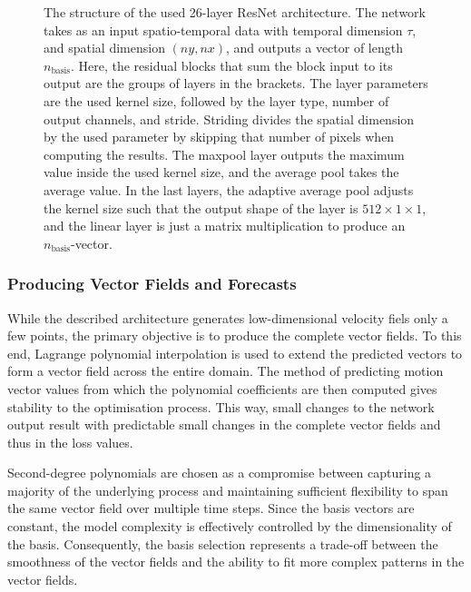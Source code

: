 \begin{figure}[H]
    \centering
    \begin{footnotesize}
        
    \end{footnotesize}
    \caption{\label{fig:resnetmodel}The structure of the used 26-layer ResNet architecture.
    The network takes as an input spatio-temporal data with temporal dimension $\tau$, and spatial dimension $(ny,nx)$, and outputs a vector of length $n_{\text{basis}}$.
    Here, the residual blocks that sum the block input to its output are the groups of layers in the brackets.
    The layer parameters are the used kernel size, followed by the layer type, number of output channels, and stride.
    Striding divides the spatial dimension by the used parameter by skipping that number of pixels when computing the results.
    The maxpool layer outputs the maximum value inside the used kernel size, and the average pool takes the average value.
    In the last layers, the adaptive average pool adjusts the kernel size such that the output shape of the layer is $512 \times 1 \times 1$, and the linear layer is just a matrix multiplication to produce an $n_{\text{basis}}$-vector.
}
\end{figure}

\subsubsection{Producing Vector Fields and Forecasts}
While the described architecture generates low-dimensional velocity fiels only a few points, the primary objective is to produce the complete vector fields.
To this end, Lagrange polynomial interpolation is used to extend the predicted vectors to form a vector field across the entire domain.
The method of predicting motion vector values from which the polynomial coefficients are then computed gives stability to the optimisation process.
This way, small changes to the network output result with predictable small changes in the complete vector fields and thus in the loss values.

Second-degree polynomials are chosen as a compromise between capturing a majority of the underlying process and maintaining sufficient flexibility to span the same vector field over multiple time steps.
Since the basis vectors are constant, the model complexity is effectively controlled by the dimensionality of the basis.
Consequently, the basis selection represents a trade-off between the smoothness of the vector fields and the ability to fit more complex patterns in the vector fields.

